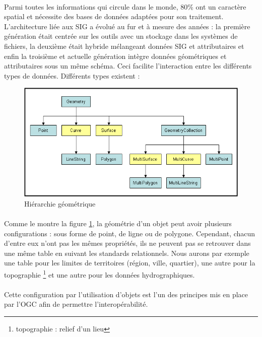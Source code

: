 \paragraph{}Parmi toutes les informations qui circule dans le monde, 80\% ont un caractère spatial et nécessite des bases de données adaptées pour son traitement. L’architecture liée aux SIG a évolué au fur et à mesure des années : la première génération était centrée sur les outils avec un stockage dans les systèmes de fichiers, la deuxième était hybride mélangeant données SIG et attributaires et enfin la troisième et actuelle génération intègre données géométriques et attributaires sous un même schéma. Ceci facilite l’interaction entre les différents types de données. Différents types existent :
\begin{figure}[htp]
  \centering
  \includegraphics[width=140mm]{src_img/geometryhierarchy.png}
  \caption{Hiérarchie géométrique \supercite{hierarchygeo}}
  \label{fig:geometryHierarchie}
\end{figure}

\paragraph{}Comme le montre la figure \ref{fig:geometryHierarchie}, la géométrie d'un objet peut avoir plusieurs configurations : sous forme de point, de ligne ou de polygone. Cependant, chacun d'entre eux n'ont pas les mêmes propriétés, ils ne peuvent pas se retrouver dans une même table en suivant les standards relationnels. Nous aurons par exemple une table pour les limites de territoires (région, ville, quartier), une autre pour la topographie \footnote{topographie : relief d'un lieu} et une autre pour les données hydrographiques.

\paragraph{}Cette configuration par l'utilisation d'objets est l'un des principes mis en place par l’\acrfull{OGC} afin de permettre l'interopérabilité.


